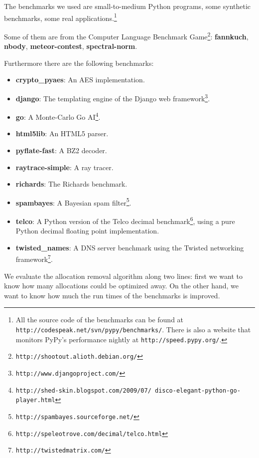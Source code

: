 \documentclass{sigplanconf}
\begin{document}
The
benchmarks we used are small-to-medium Python programs, some synthetic
benchmarks, some real applications.\footnote{All the source code of the
benchmarks can be found at \texttt{http://codespeak.net/svn/pypy/benchmarks/}.
There is also a website that monitors PyPy's performance nightly at
\texttt{http://speed.pypy.org/}.}

Some of them are from the Computer Language Benchmark
Game\footnote{\texttt{http://shootout.alioth.debian.org/}}: \textbf{fannkuch},
\textbf{nbody}, \textbf{meteor-contest}, \textbf{spectral-norm}.

Furthermore there are the following benchmarks:
\begin{itemize}
    \item \textbf{crypto\_pyaes}: An AES implementation.
    \item \textbf{django}: The templating engine of the Django web
    framework\footnote{\texttt{http://www.djangoproject.com/}}.
    \item \textbf{go}: A Monte-Carlo Go
    AI\footnote{\texttt{http://shed-skin.blogspot.com/2009/07/ disco-elegant-python-go-player.html}}.
    \item \textbf{html5lib}: An HTML5 parser.
    \item \textbf{pyflate-fast}: A BZ2 decoder.
    \item \textbf{raytrace-simple}: A ray tracer.
    \item \textbf{richards}: The Richards benchmark.
    \item \textbf{spambayes}: A Bayesian spam filter\footnote{\texttt{http://spambayes.sourceforge.net/}}.
    \item \textbf{telco}: A Python version of the Telco decimal
    benchmark\footnote{\texttt{http://speleotrove.com/decimal/telco.html}},
    using a pure Python decimal floating point implementation.
    \item \textbf{twisted\_names}: A DNS server benchmark using the Twisted networking
    framework\footnote{\texttt{http://twistedmatrix.com/}}.
\end{itemize}


We evaluate the allocation removal algorithm along two lines: first we want to
know how many allocations could be optimized away. On the other hand, we want
to know how much the run times of the benchmarks is improved.
\end{document}
